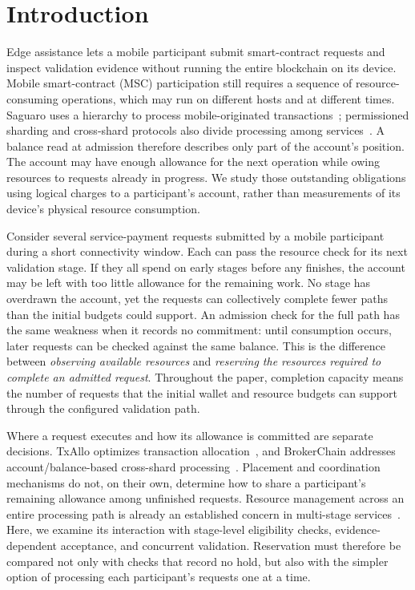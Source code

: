 \section{Introduction}

Edge assistance lets a mobile participant submit smart-contract requests and
inspect validation evidence without running the entire blockchain on its
device. Mobile smart-contract (MSC) participation still requires a sequence
of resource-consuming operations, which may run on different hosts and at
different times. Saguaro uses a hierarchy to process mobile-originated
transactions~\cite{saguaro}; permissioned sharding and cross-shard protocols
also divide processing among services~\cite{sharper,byshard,rivet}. A balance
read at admission therefore describes only part of the account's position.
The account may have enough allowance for the next operation while owing
resources to requests already in progress. We study those outstanding
obligations using logical charges to a participant's account, rather than
measurements of its device's physical resource consumption.

Consider several service-payment requests submitted by a mobile participant
during a short connectivity window. Each can pass the resource check for its
next validation stage. If they all spend on early stages before any finishes,
the account may be left with too little allowance for the remaining work.
No stage has overdrawn the account, yet the requests can collectively complete
fewer paths than the initial budgets could support. An admission check for
the full path has the same weakness when it records no commitment: until
consumption occurs, later requests can be checked against the same balance.
This is the difference between \emph{observing available resources} and
\emph{reserving the resources required to complete an admitted request}.
Throughout the paper, completion capacity means the number of requests that
the initial wallet and resource budgets can support through the configured
validation path.

Where a request executes and how its allowance is committed are separate
decisions. TxAllo optimizes transaction allocation~\cite{txallo}, and BrokerChain
addresses account/balance-based cross-shard processing~\cite{brokerchain}.
Placement and coordination mechanisms do not, on their own, determine how to
share a participant's remaining allowance among unfinished requests. Resource
management across an entire processing path is already an established concern
in multi-stage services~\cite{inferline}. Here, we examine its interaction with
stage-level eligibility checks, evidence-dependent acceptance, and concurrent
validation. Reservation must therefore be compared not only with checks that
record no hold, but also with the simpler option of processing each
participant's requests one at a time.

